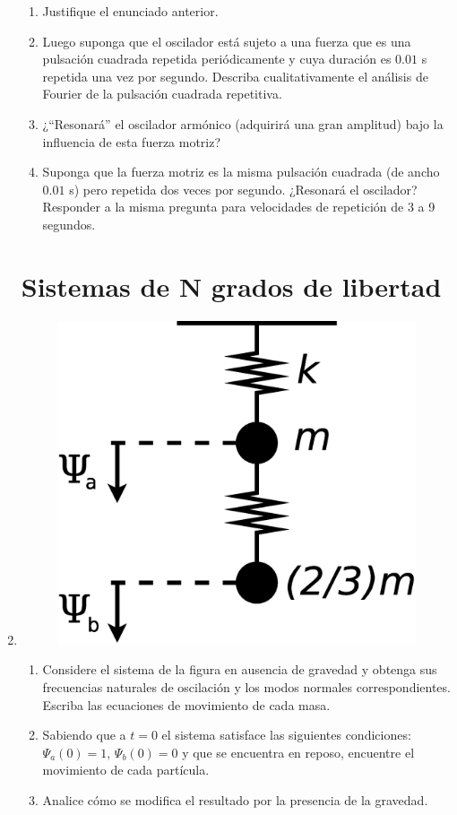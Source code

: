 \documentclass[11pt,spanish,a4paper]{article}
\begin{document}
\begin{enumerate}
\begin{enumerate}
\item Justifique el enunciado anterior. 
\item Luego suponga que el oscilador está sujeto a una fuerza que es una
pulsación cuadrada repetida periódicamente y cuya duración es $0.01$
s repetida una vez por segundo. Describa cualitativamente el análisis
de Fourier de la pulsación cuadrada repetitiva. 
\item ¿``Resonará'' el oscilador armónico (adquirirá una gran amplitud)
bajo la influencia de esta fuerza motriz? 
\item Suponga que la fuerza motriz es la misma pulsación cuadrada (de ancho
$0.01$ s) pero repetida dos veces por segundo. ¿Resonará el oscilador?
Responder a la misma pregunta para velocidades de repetición de 3
a 9 segundos.
\end{enumerate}


\section*{Sistemas de N grados de libertad}

\item %
\begin{figure}[H]
\centering{}\includegraphics[clip,scale=0.25]{ej1-6}
\end{figure}
\begin{enumerate}
\item Considere el sistema de la figura en ausencia de gravedad y obtenga
sus frecuencias naturales de oscilación y los modos normales correspondientes.
Escriba las ecuaciones de movimiento de cada masa.
\item Sabiendo que a $t=0$ el sistema satisface las siguientes condiciones:
$\Psi_{a}(0)=1,\,\Psi_{b}(0)=0$ y que se encuentra en reposo, encuentre
el movimiento de cada partícula. 
\item Analice cómo se modifica el resultado por la presencia de la gravedad.
\end{enumerate}




\end{enumerate}
\end{document}
